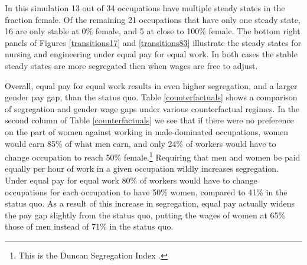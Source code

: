 \documentclass[12pt]{article}
\begin{document}
In this simulation 13 out of 34 occupations have multiple steady states in the fraction female.  Of the remaining 21 occupations that have only one steady state, 16 are only stable at 0\% female, and 5 at close to 100\% female. The bottom right panels of Figures \ref{transitions17} and \ref{transitions83} illustrate the steady states for nursing and engineering under equal pay for equal work. In both cases the stable steady states are more segregated then when wages are free to adjust. 

Overall, equal pay for equal work results in even higher segregation, and a larger gender pay gap, than the status quo. Table \ref{counterfactuals} shows a comparison of segregation and gender wage gaps under various counterfactual regimes.  In the second column of Table \ref{counterfactuals} we see that if there were no preference on the part of women against working in male-dominated occupations, women would earn 85\% of what men earn, and only 24\% of workers would have to change occupation to reach 50\% female.\footnote{This is the Duncan Segregation Index \cite{OtisDudleyDuncan1955}.} Requiring that men and women be paid equally per hour of work in a given occupation wildly increases segregation. Under equal pay for equal work 80\% of workers would have to change occupations for each occupation to have 50\% women, compared to 41\% in the status quo. As a result of this increase in segregation, equal pay actually widens the pay gap slightly from the status quo, putting the wages of women at 65\% those of men instead of 71\% in the status quo.


\end{document}
